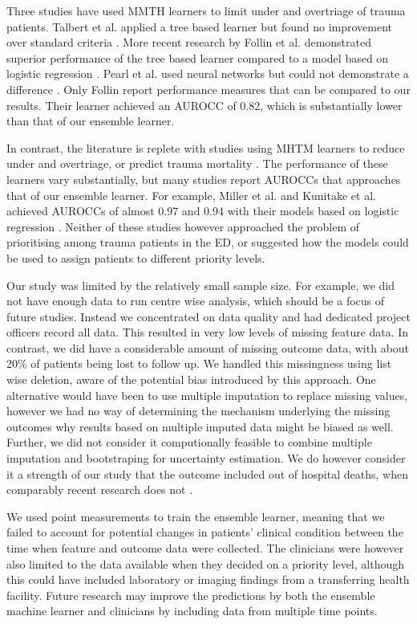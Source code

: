 \documentclass[10pt,letterpaper]{article}\usepackage[]{graphicx}\usepackage[]{color}
\begin{document}
Three studies have used MMTH learners to limit under and overtriage of trauma
patients.  Talbert et al. applied a tree based learner but found no improvement
over standard criteria \cite{Talbert2007}. More recent research by Follin et
al. demonstrated superior performance of the tree based learner compared to a
model based on logistic regression \cite{Follin2016}. Pearl et al. used neural
networks but could not demonstrate a difference \cite{Pearl2008}. Only Follin
report performance measures that can be compared to our results. Their learner
achieved an AUROCC of 0.82, which is substantially lower than that of our
ensemble learner.

In contrast, the literature is replete with studies using MHTM learners to
reduce under and overtriage, or predict trauma mortality \cite{Rehn2011,
  DeMunter2017,VanRein2018}. The performance of these learners vary
substantially, but many studies report AUROCCs that approaches that of our
ensemble learner. For example, Miller et al. and Kunitake et al. achieved
AUROCCs of almost 0.97 and 0.94 with their models based on logistic regression
\cite{Miller2017}. Neither of these studies however approached the problem of
prioritising among trauma patients in the ED, or suggested how the models could
be used to assign patients to different priority levels.

Our study was limited by the relatively small sample size. For example, we did
not have enough data to run centre wise analysis, which should be a focus of
future studies. Instead we concentrated on data quality and had dedicated
project officers record all data. This resulted in very low levels of missing
feature data. In contrast, we did have a considerable amount of missing outcome
data, with about 20\% of patients being lost to follow up. We handled this
missingness using list wise deletion, aware of the potential bias introduced by
this approach. One alternative would have been to use multiple imputation to
replace missing values, however we had no way of determining the mechanism
underlying the missing outcomes why results based on multiple imputed data might
be biased as well. Further, we did not consider it computionally feasible to
combine multiple imputation and bootstraping for uncertainty estimation. We do
however consider it a strength of our study that the outcome included out of
hospital deaths, when comparably recent research does not \cite{Levin2018,
  Kunitake2018}.

We used point measurements to train the ensemble learner, meaning that we failed
to account for potential changes in patients' clinical condition between the
time when feature and outcome data were collected. The clinicians were however
also limited to the data available when they decided on a priority level,
although this could have included laboratory or imaging findings from a
transferring health facility. Future research may improve the predictions by
both the ensemble machine learner and clinicians by including data from multiple
time points.
\end{document}
